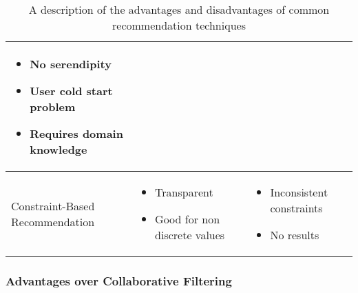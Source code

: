 \begin{table}
\begin{center}
\begin{tabularx}{\columnwidth}{X|X|X}
\begin{itemize}[noitemsep,topsep=0pt,parsep=0pt,partopsep=0pt, leftmargin=3.5mm]
                    \item No serendipity
                    \item User cold start problem
                    \item Requires domain knowledge
                \end{itemize} \\
            \hline
            Constraint-Based Recommendation 
            &   \begin{itemize}[noitemsep,topsep=0pt,parsep=0pt,partopsep=0pt, leftmargin=3.5mm]
                    \item Transparent
                    \item Good for non discrete values
                \end{itemize}
            &   \begin{itemize}[noitemsep,topsep=0pt,parsep=0pt,partopsep=0pt, leftmargin=3.5mm]
                    \item Inconsistent constraints
                    \item No results
                \end{itemize} \\ 
        \end{tabularx}
        \caption{A description of the advantages and disadvantages of common recommendation techniques \cite{richthammerSituationAwarenessRecommender2018, shokeenStudyFeaturesSocial2019,hahslerRecommenderlabFrameworkDeveloping2015, aminiDiscoveringImpactKnowledge2011, suSurveyCollaborativeFiltering2009}}
        \label{tab:Foundations:RecommenderComparison}
    \end{center}
\end{table}

\subsubsection{Advantages over Collaborative Filtering}

